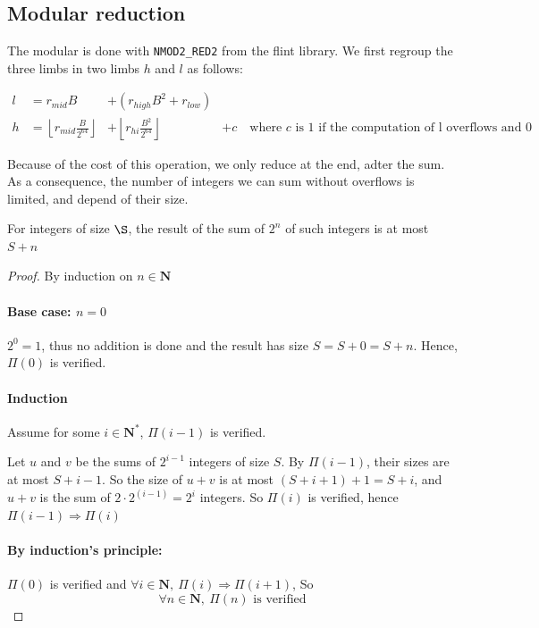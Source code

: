\documentclass[a4paper]{article}
\begin{document}
\subsection{Modular reduction}

The modular is done with \texttt{NMOD2\_RED2} from the flint library. We first regroup the three limbs in two limbs $h$ and $l$ as follows:

\begin{align}
    l &= r_{mid}B &+ \left(r_{high}B^2 + r_{low}\right) \\
    h &= \left\lfloor r_{mid}\frac{B}{2^{64}}\right\rfloor &+ \left\lfloor r_{hi}\frac{B^2}{2^{64}}\right\rfloor &+ c \quad{\text{where $c$ is $1$ if the computation of l overflows and 0 otherwise}}
\end{align}

Because of the cost of this operation, we only reduce at the end, adter the sum. As a consequence, the number of integers we can sum without overflows is limited, and depend of their size.

\begin{proposition}\label{prop:sum}
    For integers of size $\S$, the result of the sum of $2^n$ of such integers is at most $S + n$
\end{proposition}

\begin{proof}
    By induction on $n\in\mathbf{N}$

    \paragraph{Base case: $n = 0$}
    $2^0 = 1$, thus no addition is done and the result has size $S = S + 0 = S + n$. Hence, $\Pi(0)$ is verified.

    \paragraph{Induction}
    Assume for some $i \in \mathbf{N}^*$, $\Pi(i - 1)$ is verified.

    Let $u$ and $v$ be the sums of $2^{i-1}$ integers of size $ S $. By $\Pi(i-1)$, their sizes are at most $S + i - 1$. So the size of $u + v$ is at most $\left(S + i + 1\right) + 1 = S + i$, and $u + v$ is the sum of $2 \cdot 2^(i-1) = 2^i$ integers.
    So $\Pi(i)$ is verified, hence $\Pi(i-1) \Rightarrow \Pi(i)$

    \paragraph{By induction's principle:} $\Pi(0)$ is verified and $\forall i\in\mathbf{N},\ \Pi(i) \Rightarrow \Pi(i+1)$, So
    \begin{displaymath}
        \forall n\in\mathbf{N},\ \Pi(n)\text{ is verified}
    \end{displaymath}
\end{proof}
\end{document}
